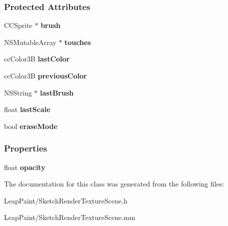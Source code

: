 \subsubsection*{Protected Attributes}
\begin{DoxyCompactItemize}
\item 
\hypertarget{interface_sketch_render_texture_scene_aa4cfb454da9318e217a79a67e3bf448b}{C\-C\-Sprite $\ast$ {\bfseries brush}}\label{dc/d61/interface_sketch_render_texture_scene_aa4cfb454da9318e217a79a67e3bf448b}

\item 
\hypertarget{interface_sketch_render_texture_scene_a7e5c4598bcf3407b3d4befe71c94a173}{N\-S\-Mutable\-Array $\ast$ {\bfseries touches}}\label{dc/d61/interface_sketch_render_texture_scene_a7e5c4598bcf3407b3d4befe71c94a173}

\item 
\hypertarget{interface_sketch_render_texture_scene_a27797c9d0ad569c6f087455b8267ac0b}{cc\-Color3\-B {\bfseries last\-Color}}\label{dc/d61/interface_sketch_render_texture_scene_a27797c9d0ad569c6f087455b8267ac0b}

\item 
\hypertarget{interface_sketch_render_texture_scene_a0756769009fefbc8c293b79924819b90}{cc\-Color3\-B {\bfseries previous\-Color}}\label{dc/d61/interface_sketch_render_texture_scene_a0756769009fefbc8c293b79924819b90}

\item 
\hypertarget{interface_sketch_render_texture_scene_af46ce82ccc632552e36713adc3316953}{N\-S\-String $\ast$ {\bfseries last\-Brush}}\label{dc/d61/interface_sketch_render_texture_scene_af46ce82ccc632552e36713adc3316953}

\item 
\hypertarget{interface_sketch_render_texture_scene_adcbd396c558092d4f7c5c9f13689474d}{float {\bfseries last\-Scale}}\label{dc/d61/interface_sketch_render_texture_scene_adcbd396c558092d4f7c5c9f13689474d}

\item 
\hypertarget{interface_sketch_render_texture_scene_ad00f05bffe4c627a9110af74f0b62c40}{bool {\bfseries erase\-Mode}}\label{dc/d61/interface_sketch_render_texture_scene_ad00f05bffe4c627a9110af74f0b62c40}

\end{DoxyCompactItemize}
\subsubsection*{Properties}
\begin{DoxyCompactItemize}
\item 
\hypertarget{interface_sketch_render_texture_scene_a2da8ec607142867715ed748a379f7043}{float {\bfseries opacity}}\label{dc/d61/interface_sketch_render_texture_scene_a2da8ec607142867715ed748a379f7043}

\end{DoxyCompactItemize}


The documentation for this class was generated from the following files\-:\begin{DoxyCompactItemize}
\item 
Leap\-Paint/Sketch\-Render\-Texture\-Scene.\-h\item 
Leap\-Paint/Sketch\-Render\-Texture\-Scene.\-mm\end{DoxyCompactItemize}

